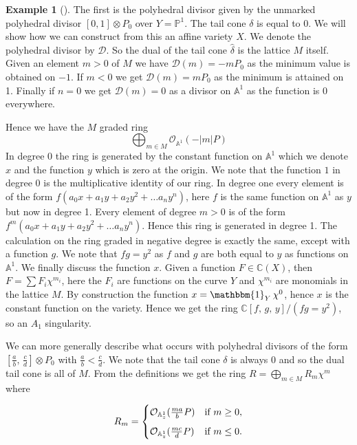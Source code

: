 \documentclass[12pt,a4paper]{book}      %
\theoremstyle{definition}
\newtheorem{ex}[thm]{Example}
\newcommand{\mb}[1]{\mathbb{#1}}
\begin{document}
\begin{ex}[\label{ToricDowngrade}]
The first is the polyhedral divisor given by the unmarked polyhedral divisor $[0, 1] \otimes P_0$ over $Y = \mb{P}^1$. 
The tail cone $\delta$ is equal to $0$. We will show how we can construct from this an affine variety $X$. We denote the polyhedral divisor by $\mathcal{D}$. So the dual of the tail cone $\hat{\delta}$ is the lattice $M$ itself. Given an element $ m >0$ of $M$ we have $\mathcal{D}(m) = -mP_0$ as the minimum value is obtained on $-1$. If $m <0$ we get $\mathcal{D}(m) = mP_0$  as the minimum is attained on 1. Finally if $n=0$ we get $\mathcal{D}(m) = 0$ as a divisor on $\mathbb{A}^1$ as the function is 0 everywhere. 


Hence we have the $M$ graded ring
\[
\bigoplus_{m \in M} \mathcal{O}_{\mathbb{A}^1}(-|m|P)
\]
In degree 0 the ring is generated by the constant function on $\mb{A}^1$ which we denote $x$ and the function $y$ which is zero at the origin. We note that the function $1$ in degree 0 is the multiplicative identity of our ring. In degree one every element is of the form $f ( a_0 x + a_1 y + a_2 y^2 + \dots  a_n y^n)$, here $f$ is the same function on $\mb{A}^1$ as $y$ but now in degree 1. Every element of degree $m>0$ is of the form $f^m ( a_0 x + a_1 y + a_2 y^2 + \dots  a_n y^n)$. Hence this ring is generated in degree 1. The calculation on the ring graded in negative degree is exactly the same, except with a function $g$.  We note that $fg = y^2$ as $f$ and $g$ are both equal to $y$ as functions on $\mb{A}^1$. We finally discuss the function $x$. Given a function $F \in \mb{C}(X)$, then $F = \sum F_i \chi^{m_i}$, here the $F_i$ are functions on the curve $Y$ and $\chi^{m_i}$ are monomials in the lattice $M$. By construction the function $x = \mathbbm{1}_{Y} \, \chi^0$, hence $x$ is the constant function on the variety. Hence we get the ring $\mathbb{C}[f,  \, g, \, y]/ (fg=y^2)$, so an $A_1$ singularity.
\end{ex}

We can more generally describe what occurs with polyhedral divisors of the form $[\frac{a}{b}, \, \frac{c}{d}] \otimes P_0$ with $\frac{a}{b} < \frac{c}{d}$. We note that the tail cone $\delta$ is always 0 and so the dual tail cone is all of $M$. From the definitions we get the ring $R = \bigoplus_{m \in M} R_m \chi^m$ where

\[
R_m = 
\begin{cases}
\mathcal{O}_{\mb{A}_z^1} ( \frac{ma}{b}P) & \text{if } m \geq 0,  \vspace{0.2cm} \\
\mathcal{O}_{\mb{A}_z^1} ( \frac{mc}{d}P) & \text{if } m \leq 0.
\end{cases}
\]
\end{document}
